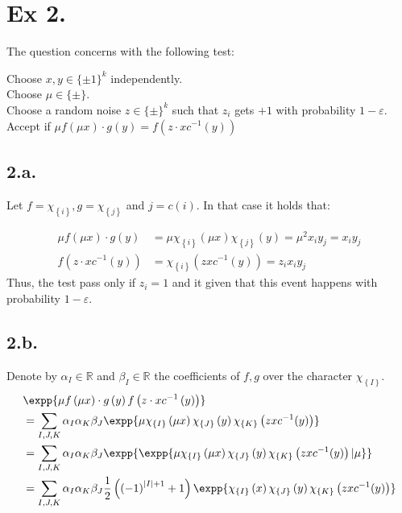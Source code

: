 \documentclass{article}
\newcommand{\Chi}[1]{\chi_{ \left\{ #1  \right\} } }
\begin{document}
\section{Ex 2.}
The question concerns with the following test:

\begin{algorithm}[H]
  Choose $x,y \in \{\pm1\}^{k}$ independently. \\
  Choose $\mu \in \{\pm\}$. \\ 
  Choose a random noise $z \in \{\pm\}^{k}$ such that $z_{i}$ gets $+1$ with probability $1-\varepsilon$.  \\
  Accept if $\mu f\left( \mu x \right) \cdot g\left( y \right) = f\left(z \cdot x c^{-1}\left( y \right)  \right)$

\end{algorithm}


\subsection{2.a.} Let $f = \Chi{i}, g = \Chi{j}$ and $j = c(i)$. In that case it holds that: 

\begin{equation*}
  \begin{split}
    \mu f\left( \mu x \right) \cdot g\left( y \right)  &= \mu \Chi{i}\left( \mu x \right)\Chi{j}\left( y \right) = \mu^{2}x_{i}y_{j} = x_{i}y_{j} \\ 
    f\left(z \cdot x c^{-1}\left( y \right)  \right) & = \Chi{i}\left( zx c^{-1}(y) \right) = z_{i}x_{i}y_{j} 
  \end{split}
\end{equation*}
Thus, the test pass only if $z_{i} = 1$ and it given that this event happens with probability $1-\varepsilon$. 

\subsection{2.b.} 
Denote by $\alpha_{I} \in \mathbb{R}$ and $\beta_{I} \in \mathbb{R}$ the coefficients of $f,g$ over the character $\Chi{I}$.  
\begin{equation*}
  \begin{split}
    & \expp{\mu f\left( \mu x \right) \cdot g\left( y \right)f\left(z \cdot x c^{-1}\left( y \right)  \right)} \\
    & = \sum_{I,J,K}\alpha_{I}\alpha_{K}\beta_{J}\expp{ \mu \Chi{I}\left( \mu x \right)\Chi{J}\left( y \right) \Chi{K}\left( zx c^{-1}(y) \right) } \\
    & = \sum_{I,J,K}\alpha_{I}\alpha_{K}\beta_{J}\expp{\expp{ \mu \Chi{I}\left( \mu x \right)\Chi{J}\left( y \right) \Chi{K}\left( zx c^{-1}(y) \right)|\mu}} \\ 
    & = \sum_{I,J,K}\alpha_{I}\alpha_{K}\beta_{J}\frac{1}{2}\left( \left( - 1 \right)^{|I|+1}  + 1\right) \expp{  \Chi{I}\left(  x \right)\Chi{J}\left( y \right) \Chi{K}\left( zx c^{-1}(y) \right) }  
  \end{split}
\end{equation*}
\end{document}
